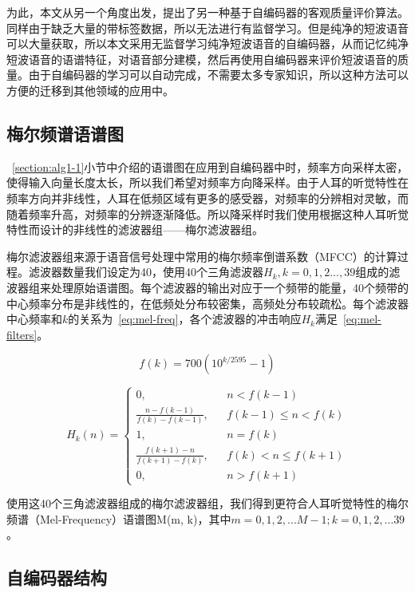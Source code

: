 为此，本文从另一个角度出发，提出了另一种基于自编码器的客观质量评价算法。同样由于缺乏大量的带标签数据，所以无法进行有监督学习。但是纯净的短波语音可以大量获取，所以本文采用无监督学习纯净短波语音的自编码器，从而记忆纯净短波语音的语谱特征，对语音部分建模，然后再使用自编码器来评价短波语音的质量。由于自编码器的学习可以自动完成，不需要太多专家知识，所以这种方法可以方便的迁移到其他领域的应用中。

\subsection{梅尔频谱语谱图}

~\ref{section:alg1-1}小节中介绍的语谱图在应用到自编码器中时，频率方向采样太密，使得输入向量长度太长，所以我们希望对频率方向降采样。由于人耳的听觉特性在频率方向并非线性，人耳在低频区域有更多的感受器，对频率的分辨相对灵敏，而随着频率升高，对频率的分辨逐渐降低。所以降采样时我们使用根据这种人耳听觉特性而设计的非线性的滤波器组——梅尔滤波器组。

梅尔滤波器组来源于语音信号处理中常用的梅尔频率倒谱系数（MFCC）的计算过程。滤波器数量我们设定为40，使用40个三角滤波器$H_k, k=0,1,2...,39$组成的滤波器组来处理原始语谱图。每个滤波器的输出对应于一个频带的能量，40个频带的中心频率分布是非线性的，在低频处分布较密集，高频处分布较疏松。每个滤波器中心频率和$k$的关系为~\ref{eq:mel-freq}，各个滤波器的冲击响应$H_k$满足~\ref{eq:mel-filters}。

\begin{equation}\label{eq:mel-freq}
f(k) = 700(10^{k/2595}-1)
\end{equation}

\begin{equation}\label{eq:mel-filters}
H_k(n) = \left\{
    \begin{array}{rcl}
    0, && {n<f(k-1)} \\
    \frac{n-f(k-1)}{f(k)-f(k-1)}, && {f(k-1)\leq n < f(k)} \\
    1, && {n=f(k)} \\
    \frac{f(k+1)-n}{f(k+1)-f(k)}, && {f(k) < n \leq f(k+1)} \\
    0, && {n > f(k+1)}
    \end{array} \right.
\end{equation}

使用这40个三角滤波器组成的梅尔滤波器组，我们得到更符合人耳听觉特性的梅尔频谱（Mel-Frequency）语谱图M(m, k)，其中$m=0,1,2,...M-1; k=0,1,2,…39$。

\subsection{自编码器结构}

